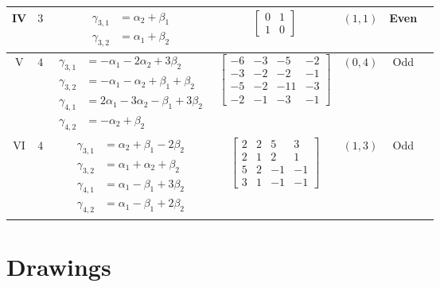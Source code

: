 \begin{center}
\begin{tabular}{|c|c|c|c|c|c|c|}
		IV & $3$ & \parbox{4.25cm}{\begin{align*}
			\gamma_{3,1} &= \alpha_2 + \beta_1\\
			\gamma_{3,2} &= \alpha_1 + \beta_2
		\end{align*}} & $\begin{bmatrix} 0 & 1\\1 & 0 \end{bmatrix}$ & $(1,1)$ & Even\\%
		\hline
		V & $4$ & \parbox{4.25cm}{\begin{align*}
			\gamma_{3,1} &= -\alpha_1 - 2\alpha_2 + 3\beta_2\\
			\gamma_{3,2} &= -\alpha_1 - \alpha_2 + \beta_1 + \beta_2\\
			\gamma_{4,1} &= 2\alpha_1 - 3\alpha_2 - \beta_1 + 3\beta_2\\
			\gamma_{4,2} &= -\alpha_2 + \beta_2
		\end{align*}} & $\begin{bmatrix} -6 & -3 & -5 & -2\\-3 & -2 & -2 & -1\\-5 & -2 & -11 & -3\\-2 & -1 & -3 & -1 \end{bmatrix}$ & $(0,4)$ & Odd\\ %
		\hline
		VI & $4$ & \parbox{4.25cm}{\begin{align*}
			\gamma_{3,1} &= \alpha_2 + \beta_1 - 2\beta_2\\
			\gamma_{3,2} &= \alpha_1 + \alpha_2 + \beta_2\\
			\gamma_{4,1} &= \alpha_1 - \beta_1 + 3\beta_2\\
			\gamma_{4,2} &= \alpha_1 - \beta_1 + 2\beta_2
		\end{align*}} & $\begin{bmatrix} 2 & 2 & 5 & 3\\2 & 1 & 2 & 1\\5 & 2 & -1 & -1\\3 & 1 & -1 & -1 \end{bmatrix}$ & $(1,3)$ & Odd\\ %
		\hline
	\end{tabular}
\end{center}

\section{Drawings}

